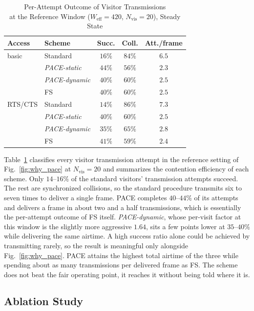 \documentclass[journal,10pt]{IEEEtran}
\newcommand{\Nvis}{N_\mathrm{vis}}
\begin{document}
\begin{table}[t]
\centering
\caption{Per-Attempt Outcome of Visitor Transmissions\\at the Reference Window ($W_\mathrm{eff}=420$, $\Nvis=20$), Steady State}
\label{tab:attempts}
\begin{tabular}{llccc}
\hline
\textbf{Access} & \textbf{Scheme} & \textbf{Succ.} & \textbf{Coll.} & \textbf{Att./frame} \\
\hline
basic   & Standard & $16\%$ & $84\%$ & $6.5$ \\
        & \emph{PACE-static}   & $44\%$ & $56\%$ & $2.3$ \\
        & \emph{PACE-dynamic}  & $40\%$ & $60\%$ & $2.5$ \\
        & FS            & $40\%$ & $60\%$ & $2.5$ \\
\hline
RTS/CTS & Standard & $14\%$ & $86\%$ & $7.3$ \\
        & \emph{PACE-static}   & $40\%$ & $60\%$ & $2.5$ \\
        & \emph{PACE-dynamic}  & $35\%$ & $65\%$ & $2.8$ \\
        & FS            & $41\%$ & $59\%$ & $2.4$ \\
\hline
\end{tabular}
\end{table}

Table~\ref{tab:attempts} classifies every visitor transmission attempt
in the reference setting of Fig.~\ref{fig:why_pace} at $\Nvis=20$ and summarizes the
contention efficiency of each scheme. Only $14$--$16\%$ of the
standard visitors' transmission attempts succeed. The rest are
synchronized collisions, so the standard procedure transmits six to
seven times to deliver a single frame. PACE completes $40$--$44\%$ of
its attempts and delivers a frame in about two and a half
transmissions, which is essentially the per-attempt outcome of FS
itself. \emph{PACE-dynamic}, whose per-visit factor at this window is the
slightly more aggressive $1.64$, sits a few points lower at
$35$--$40\%$ while delivering the same airtime. A high success ratio alone could be achieved by transmitting rarely, so
the result is meaningful only alongside Fig.~\ref{fig:why_pace}. PACE
attains the highest total airtime of the three while spending about as
many transmissions per delivered frame as FS. The scheme does not beat
the fair operating point, it reaches it without being told where it is.

\subsection{Ablation Study}
\label{subsec:eval_ablation}
\end{document}
